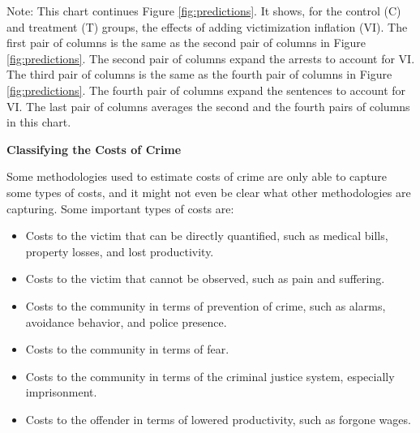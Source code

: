 \documentclass[static]{JJH-Beamer}
\begin{document}
{\flushleft \normalsize Note: This chart continues Figure \ref{fig:predictions}. It shows, for the control (C) and treatment (T) groups, the effects of adding victimization inflation (VI). The first pair of columns is the same as the second pair of columns in Figure \ref{fig:predictions}. The second pair of columns expand the arrests to account for VI. The third pair of columns is the same as the fourth pair of columns in Figure \ref{fig:predictions}. The fourth pair of columns expand the sentences to account for VI. The last pair of columns averages the second and the fourth pairs of columns in this chart.\\}

\begin{frame}
 \addtocounter{framenumber}{-1}

\begin{center}
\textbf{Classifying the Costs of Crime}
\end{center}
Some methodologies used to estimate costs of crime are only able to capture some types of costs, and it might not even be clear what other methodologies are capturing. Some important types of costs are:
\begin{itemize}
\item Costs to the victim that can be directly quantified, such as medical bills, property losses, and lost productivity.
\item Costs to the victim that cannot be observed, such as pain and suffering.
\item Costs to the community in terms of prevention of crime, such as alarms, avoidance behavior, and police presence.
\item Costs to the community in terms of fear.
\item Costs to the community in terms of the criminal justice system, especially imprisonment.
\item Costs to the offender in terms of lowered productivity, such as forgone wages.
\end{itemize}

\end{frame}
\end{document}
